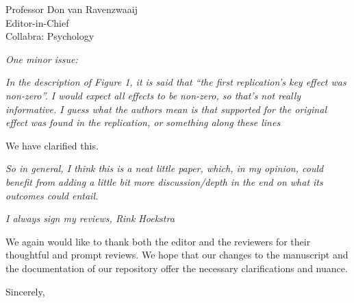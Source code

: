 \documentclass{stanfordletter}
\newcommand{\theysaid}[1]{\begin{leftbar} \noindent 
		\textsl{ #1}\end{leftbar}}
\begin{document}
\begin{letter}{Professor Don van Ravenzwaaij \\ Editor-in-Chief \\ Collabra: Psychology }
		\theysaid{One minor issue:}
		\theysaid{In the description of Figure 1, it is said that “the first replication’s key effect was non-zero”. I would expect all effects to be non-zero, so that’s not really informative. I guess what the authors mean is that supported for the original effect was found in the replication, or something along these lines}
		
		We have clarified this. 
		\theysaid{So in general, I think this is a neat little paper, which, in my opinion, could benefit from adding a little bit more discussion/depth in the end on what its outcomes could entail.}
		
		\theysaid{I always sign my reviews,
		Rink Hoekstra}
		
		We again would like to thank both the editor and the reviewers for their thoughtful and prompt reviews. We hope that our changes to the manuscript and the documentation of our repository offer the necessary clarifications and nuance. 
		
		
          
          \closing{Sincerely,}
	\end{letter}
	
\end{document}
